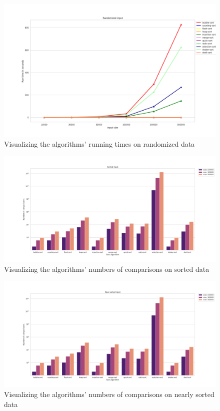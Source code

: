 \documentclass[11pt,a4paper]{article}
\begin{document}
\begin{figure}[H]
  \includegraphics[width = 16cm]{plot/rand_line.png}
  \centering
  \caption{Visualizing the algorithms' running times on randomized data}
\end{figure}

\begin{figure}[H]
  \includegraphics[width = 16cm]{plot/sorted_bar.png}
  \centering
  \caption{Visualizing the algorithms' numbers of comparisons on sorted data}
\end{figure}

\begin{figure}[H]
  \includegraphics[width = 16cm]{plot/nsorted_bar.png}
  \centering
  \caption{Visualizing the algorithms' numbers of comparisons on nearly sorted data}
\end{figure}
\end{document}
